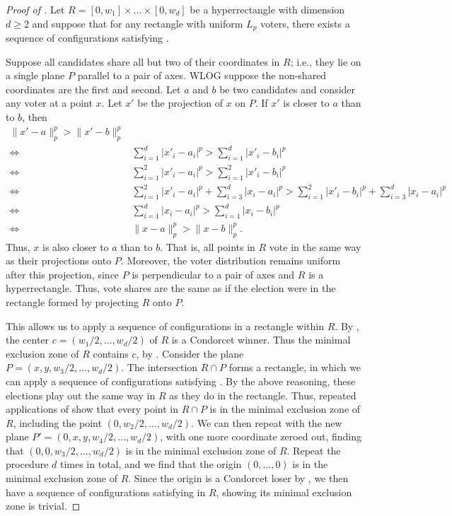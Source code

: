 \documentclass{article}
\theoremstyle{theorem}
\theoremstyle{definition}
\begin{document}
\begin{proof}[Proof of ]
Let $R = [0, w_1]\times\dots \times [0, w_d]$ be a hyperrectangle with dimension $d\ge 2$ and suppose that for any rectangle with uniform $L_p$ voters, there exists a sequence of configurations satisfying . 

  Suppose all candidates share all but two of their coordinates in $R$; i.e., they lie on a single plane $P$ parallel to a pair of axes. WLOG suppose the non-shared coordinates are the first and second. Let $a$ and $b$ be two candidates and consider any voter at a point $x$. Let $x'$ be the projection of $x$ on $P$. If $x'$ is closer to $a$ than to $b$, then
  \begin{align*}
    \|x' - a\|_p^p > \|x' - b\|_p^p\\
    \Leftrightarrow \quad & \sum_{i = 1}^d |x'_i - a_i|^p> \sum_{i = 1}^d |x'_i - b_i|^p \\
    \Leftrightarrow \quad &  \sum_{i = 1}^2 |x'_i - a_i|^p> \sum_{i = 1}^2 |x'_i - b_i|^p\tag{$x', a, b$ are all in $P$}\\
    \Leftrightarrow \quad &  \sum_{i = 1}^2 |x'_i - a_i|^p + \sum_{i = 3}^d |x_i - a_i|^p> \sum_{i = 1}^2 |x'_i - b_i|^p +  \sum_{i = 3}^d |x_i- a_i|^p\\
\Leftrightarrow \quad &  \sum_{i = 1}^d |x_i - a_i|^p > \sum_{i = 1}^d |x_i - b_i|^p \\
\Leftrightarrow \quad &  \|x - a\|_p^p > \|x - b\|_p^p.
  \end{align*}
  Thus, $x$ is also closer to $a$ than to $b$. That is, all points in $R$ vote in the same way as their projections onto $P$. Moreover, the voter distribution remains uniform after this projection, since $P$ is perpendicular to a pair of axes and $R$ is a hyperrectangle. Thus, vote shares are the same as if the election were in the rectangle formed by projecting $R$ onto $P$. 
  
  This allows us to apply a sequence of configurations in a rectangle within $R$. By , the center $c = (w_1 / 2, \dots, w_d/2)$ of $R$ is a Condorcet winner. Thus the minimal exclusion zone of $R$ contains $c$, by . Consider the plane $P = (x, y, w_3/2, \dots, w_d/2)$. The intersection $R \cap P$ forms a rectangle, in which we can apply a sequence of configurations satisfying . By the above reasoning, these elections play out the same way in $R$ as they do in the rectangle. Thus, repeated applications of  show that every point in $R \cap P$ is in the minimal exclusion zone of $R$, including the point $(0, w_2/2, \dots, w_d/2)$. We can then repeat with the new plane $P' = (0, x, y, w_4/2, \dots, w_d / 2)$, with one more coordinate zeroed out, finding that $(0, 0, w_3/2, \dots, w_d/2)$ is in the minimal exclusion zone of $R$. Repeat the procedure $d$ times in total, and we find that the origin $(0, \dots, 0)$ is in the minimal exclusion zone of $R$. Since the origin is a Condorcet loser by , we then have a sequence of configurations satisfying  in $R$, showing its minimal exclusion zone is trivial. 
\end{proof}
\end{document}
